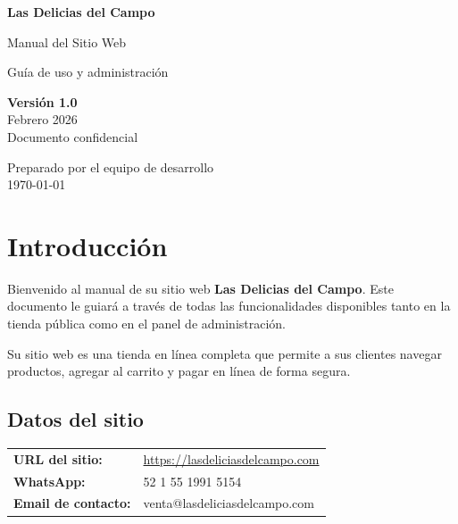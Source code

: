 \documentclass[12pt,a4paper]{article}
\begin{document}
\begin{titlepage}
    \centering
    \vspace*{3cm}

    {\Huge\bfseries\textcolor{verde}{Las Delicias del Campo}\par}
    \vspace{0.5cm}
    {\LARGE\textcolor{cafe}{Manual del Sitio Web}\par}
    \vspace{0.3cm}
    {\large\textcolor{cafe}{Guía de uso y administración}\par}

    \vspace{2cm}

    \begin{tcolorbox}[colback=crema, colframe=verde, width=10cm, halign=center, rounded corners]
        \centering
        {\large\textbf{Versión 1.0}}\\[0.3cm]
        Febrero 2026\\[0.2cm]
        \small Documento confidencial
    \end{tcolorbox}

    \vfill

    {\small\textcolor{cafe}{Preparado por el equipo de desarrollo}}\\
    {\small\textcolor{cafe}{\today}}
\end{titlepage}

\tableofcontents
\newpage

\section{Introducción}

Bienvenido al manual de su sitio web \textbf{Las Delicias del Campo}. Este documento le guiará a través de todas las funcionalidades disponibles tanto en la tienda pública como en el panel de administración.

Su sitio web es una tienda en línea completa que permite a sus clientes navegar productos, agregar al carrito y pagar en línea de forma segura.

\subsection{Datos del sitio}

\begin{credentialbox}
\begin{tabularx}{\textwidth}{lX}
    \textbf{URL del sitio:} & \url{https://lasdeliciasdelcampo.com} \\
    \textbf{WhatsApp:} & 52 1 55 1991 5154 \\
    \textbf{Email de contacto:} & venta@lasdeliciasdelcampo.com \\
\end{tabularx}
\end{credentialbox}
\end{document}
